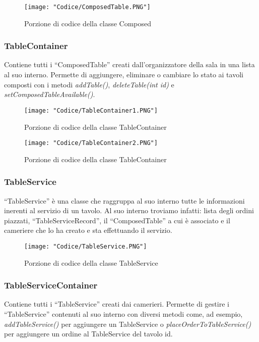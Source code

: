 \documentclass{article}
\begin{document}
\begin{figure}[!h]
\centering
\texttt{[image: "Codice/ComposedTable.PNG"]}
\caption{Porzione di codice della classe Composed}
\end{figure}

\subsubsection{TableContainer}

Contiene tutti i ``ComposedTable'' creati dall'organizzatore della sala in una lista al suo interno. Permette di aggiungere, eliminare o cambiare lo stato ai tavoli composti con i metodi \textit{addTable()}, \textit{deleteTable(int id)} e \textit{setComposedTableAvailable()}.

\begin{figure}[!h]
\centering
\texttt{[image: "Codice/TableContainer1.PNG"]}
\caption{Porzione di codice della classe TableContainer}
\end{figure}


\begin{figure}[!h]
\centering
\texttt{[image: "Codice/TableContainer2.PNG"]}
\caption{Porzione di codice della classe TableContainer}
\end{figure}

\newpage

\subsubsection{TableService}

``TableService'' \`e una classe che raggruppa al suo interno tutte le informazioni inerenti al servizio di un tavolo. Al suo interno troviamo infatti: lista degli ordini piazzati, ``TableServiceRecord'', il ``ComposedTable'' a cui \`e associato e il cameriere che lo ha creato e sta effettuando il servizio.


\begin{figure}[!h]
\centering
\texttt{[image: "Codice/TableService.PNG"]}
\caption{Porzione di codice della classe TableService}
\end{figure}

\subsubsection{TableServiceContainer}

Contiene tutti i ``TableService'' creati dai camerieri. Permette di gestire i ``TableService'' contenuti al suo interno con diversi metodi come, ad esempio, \textit{addTableService()} per aggiungere un TableService o \textit{placeOrderToTableService()} per aggiungere un ordine al TableService del tavolo id.
\end{document}
